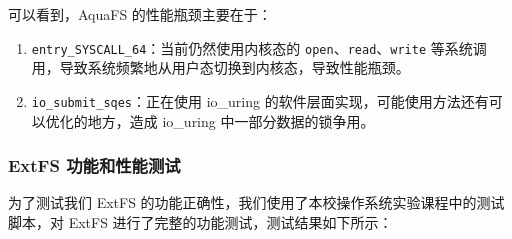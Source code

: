 可以看到，AquaFS 的性能瓶颈主要在于：

\begin{enumerate}
  \item \verb|entry_SYSCALL_64|：当前仍然使用内核态的 \verb|open|、\verb|read|、\verb|write| 等系统调用，导致系统频繁地从用户态切换到内核态，导致性能瓶颈。
  \item \verb|io_submit_sqes|：正在使用 io\_uring 的软件层面实现，可能使用方法还有可以优化的地方，造成 io\_uring 中一部分数据的锁争用。
\end{enumerate}

\subsubsection{ExtFS 功能和性能测试}

为了测试我们 ExtFS 的功能正确性，我们使用了本校操作系统实验课程中的测试脚本，对 ExtFS 进行了完整的功能测试，测试结果如下所示：

